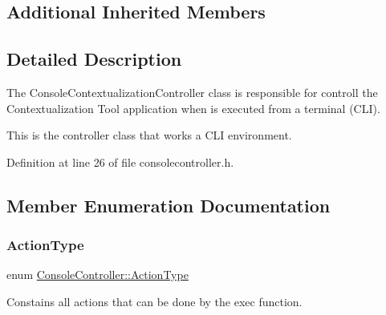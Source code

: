 \subsection*{Additional Inherited Members}


\subsection{Detailed Description}
The Console\+Contextualization\+Controller class is responsible for controll the Contextualization Tool application when is executed from a terminal (C\+LI). 

This is the controller class that works a C\+LI environment. 

Definition at line 26 of file consolecontroller.\+h.



\subsection{Member Enumeration Documentation}
\mbox{\label{classConsoleController_a6bc36e6ee00aa2da0fd9be549b4251d9}} 
\subsubsection{\texorpdfstring{Action\+Type}{ActionType}}
{\footnotesize\ttfamily enum \mbox{\hyperlink{classConsoleController_a6bc36e6ee00aa2da0fd9be549b4251d9}{Console\+Controller\+::\+Action\+Type}}}



Constains all actions that can be done by the exec function. 

